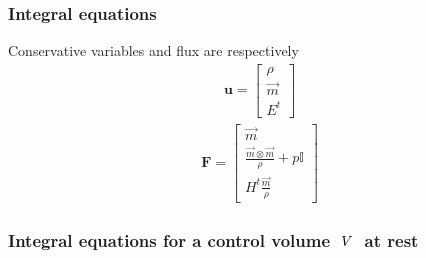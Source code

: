 \documentclass[letterpaper,10pt,english]{jupyterBook}
\begin{document}
\subsubsection{Integral equations}
\label{\detokenize{ch/pde/hyperbolic-nd-euler:integral-equations}}\label{\detokenize{ch/pde/hyperbolic-nd-euler:pde-hyperbolic-nd-euler-integral}}
\sphinxAtStartPar
Conservative variables and flux are respectively
\begin{equation}\label{equation:ch/pde/hyperbolic-nd-euler:eq:pde:hyperbolic:cons-vars:euler}
\begin{split}
\mathbf{u} = \begin{bmatrix} \rho \\ \vec{m} \\ E^t \end{bmatrix}
\end{split}
\end{equation}\begin{equation}\label{equation:ch/pde/hyperbolic-nd-euler:eq:pde:hyperbolic:flux:euler}
\begin{split}
\mathbf{F} = \begin{bmatrix} \vec{m} \\ \frac{\vec{m} \otimes \vec{m}}{\rho} + p \mathbb{I} \\ H^t \frac{\vec{m}}{\rho} \end{bmatrix}
\end{split}
\end{equation}\subsubsection*{Integral equations for a control volume \protect\(\ V \ \protect\) at rest}
\end{document}
